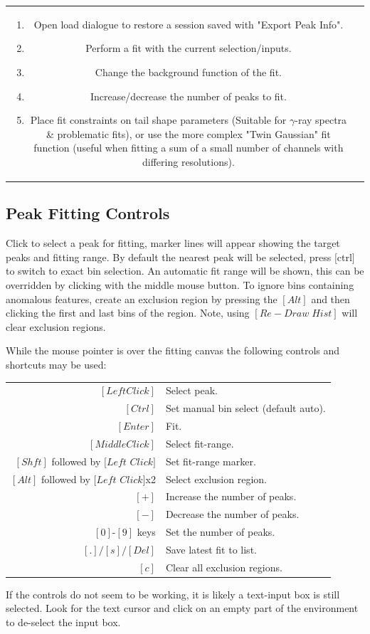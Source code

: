 \documentclass[a4paper,10pt]{article}
\begin{document}
\begin{center}
\begin{tabular}{ c c }
\begin{minipage}{0.70\textwidth}
\begin{enumerate}
\item Open load dialogue to restore a session saved with "Export Peak Info".
\item Perform a fit with the current selection/inputs.
\item Change the background function of the fit.
\item Increase/decrease the number of peaks to fit.
\item Place fit constraints on tail shape parameters (Suitable for $\gamma$-ray spectra \& problematic fits), or use the more complex "Twin Gaussian" fit function (useful when fitting a sum of a small number of channels with differing resolutions).
\end{enumerate} \end{minipage}
\\
\end{tabular}
\end{center}

\newpage
\subsection{Peak Fitting Controls}
Click to select a peak for fitting, marker lines will appear showing the target peaks and fitting range. By default the nearest peak will be selected, press $[$ctrl$]$ to switch to exact bin selection. An automatic fit range will be shown, this can be overridden by clicking with the middle mouse button. To ignore bins containing anomalous features, create an exclusion region by pressing the $[Alt]$ and then clicking the first and last bins of the region. Note, using $[Re-Draw\;Hist]$ will clear exclusion regions.
\begin{center}
While the mouse pointer is over the fitting canvas the following controls and shortcuts may be used:

\begin{tabular}{ r l }
$[Left Click]$ & Select peak.\\
$[Ctrl]$ & Set manual bin select (default auto).\\
$[Enter]$ & Fit.\\
$[Middle Click]$ & Select fit-range.\\
$[Shft]$ followed by $[Left$ $Click]$ & Set fit-range marker.\\
$[Alt]$  followed by $[Left$ $Click]$x2 & Select exclusion region.\\
$[+]$ & Increase the number of peaks.\\
$[-]$ & Decrease the number of peaks.\\
$[0]$-$[9]$ keys & Set the number of peaks.\\
$[.]/[s]/[Del]$ & Save latest fit to list.\\
$[c]$ & Clear all exclusion regions.\\
\end{tabular}

If the controls do not seem to be working, it is likely a text-input box is still selected.
Look for the text cursor and click on an empty part of the environment to de-select the input box.
\end{center}
  
\end{document}
